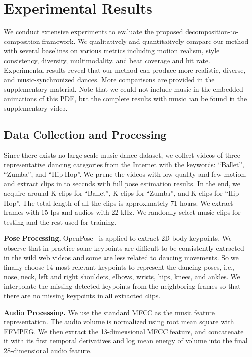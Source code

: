 \documentclass{article}
\newlength\secmargin
\begin{document}
\section{Experimental Results}
\label{sec:experiment}
\vspace{\secmargin}
We conduct extensive experiments to evaluate the proposed decomposition-to-composition framework.
We qualitatively and quantitatively compare our method with several baselines on various metrics including motion realism, style consistency, diversity, multimodality, and beat coverage and hit rate. 
Experimental results reveal that our method can produce more realistic, diverse, and music-synchronized dances. 
More comparisons are provided in the supplementary material. 
Note that we could not include music in the embedded animations of this PDF, but the complete results with music can be found in the supplementary video.  

\subsection{Data Collection and Processing}
\label{subsec:data}
Since there exists no large-scale music-dance dataset, we collect videos of three representative dancing categories from the Internet with the keywords: ``Ballet'', ``Zumba'', and ``Hip-Hop''.
We prune the videos with low quality and few motion, and extract clips in  to  seconds with full pose estimation results.
In the end, we acquire around K clips for ``Ballet'', K clips for ``Zumba'', and K clips for ``Hip-Hop''.
The total length of all the clips is approximately 71 hours.
We extract frames with 15 fps and audios with 22 kHz. 
We randomly select  music clips for testing and the rest used for training. 

\textbf{Pose Processing.} OpenPose~\cite{cao2017realtime} is applied to extract 2D body keypoints.
We observe that in practice some keypoints are difficult to be consistently extracted in the wild web videos and some are less related to dancing movements.
So we finally choose 14 most relevant keypoints to represent the dancing poses, i.e., nose, neck, left and right shoulders, elbows, wrists, hips, knees, and ankles.
We interpolate the missing detected keypoints from the neighboring frames so that there are no missing keypoints in all extracted clips.

\textbf{Audio Processing.} We use the standard MFCC as the music feature representation.
The audio volume is normalized using root mean square with FFMPEG. We then extract the 13-dimensional MFCC feature, and concatenate it with its first temporal derivatives and log mean energy of volume into the final 28-dimensional audio feature. 
\end{document}
